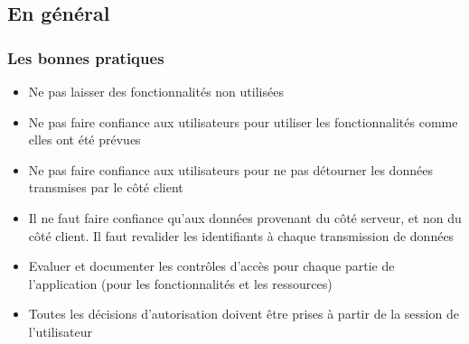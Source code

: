 \documentclass[aspectratio=169]{beamer}  %
\begin{document}
\subsection{En général}
\begin{frame}
  \frametitle{Les bonnes pratiques}
  \begin{exampleblock}{}
    \begin{itemize}
      \item Ne pas laisser des fonctionnalités non utilisées
    \end{itemize}
  \end{exampleblock}
  \pause
  \begin{exampleblock}{}
    \begin{itemize}
      \item Ne pas faire confiance aux utilisateurs pour utiliser les fonctionnalités comme elles ont été prévues
      \item Ne pas faire confiance aux utilisateurs pour ne pas détourner les données transmises par le côté client
      \item Il ne faut faire confiance qu'aux données provenant du côté serveur, et non du côté client. Il faut revalider les identifiants à chaque transmission de données
    \end{itemize}
  \end{exampleblock}
  \pause
  \begin{exampleblock}{}
    \begin{itemize}
      \item Evaluer et documenter les contrôles d'accès pour chaque partie de l'application (pour les fonctionnalités et les ressources)
    \end{itemize}
  \end{exampleblock}
  \pause
  \begin{exampleblock}{}
    \begin{itemize}
      \item Toutes les décisions d'autorisation doivent être prises à partir de la session de l'utilisateur
    \end{itemize}
  \end{exampleblock}
\end{frame}
\end{document}

